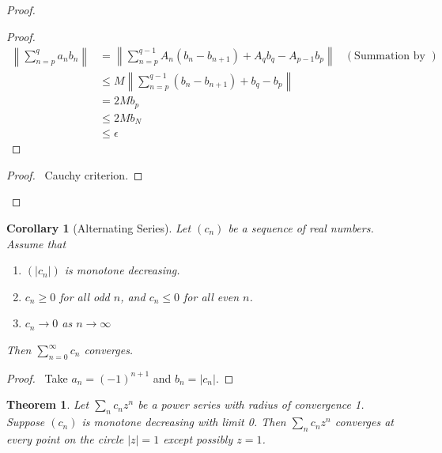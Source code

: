 \documentclass{book}
\let\qed\relax
\newtheorem{cor}{Corollary}[prop]
\newtheorem{thm}[prop]{Theorem}
\theoremstyle{definition}
\begin{document}
\begin{proof}
\pf
{}
\begin{proof}
	\pf
	\begin{align*}
		\left\| \sum_{n=p}^q a_n b_n \right\|
		& = \left\| \sum_{n=p}^{q-1} A_n (b_n - b_{n+1}) + A_q b_q - A_{p-1} b_p \right\| & (\text{Summation by Parts}) \\
		& \leq M \left\| \sum_{n=p}^{q-1} (b_n - b_{n+1}) + b_q - b_p \right\| \\
		& = 2 M b_p \\
		& \leq 2 M b_N \\
		& \leq \epsilon
	\end{align*}
\end{proof}
\qedstep
\begin{proof}
	\pf\ Cauchy criterion.
\end{proof}
\qed
\end{proof}

\begin{cor}[Alternating Series]
Let $(c_n)$ be a sequence of real numbers. Assume that
\begin{enumerate}
\item $(|c_n|)$ is monotone decreasing.
\item $c_n \geq 0$ for all odd $n$, and $c_n \leq 0$ for all even $n$.
\item $c_n \rightarrow 0$ as $n \rightarrow \infty$
\end{enumerate}
Then $\sum_{n=0}^\infty c_n$ converges.
\end{cor}

\begin{proof}
\pf\ Take $a_n = (-1)^{n+1}$ and $b_n = |c_n|$. \qed
\end{proof}

\begin{thm}
Let $\sum_n c_n z^n$ be a power series with radius of convergence 1. Suppose $(c_n)$ is monotone decreasing with limit 0. Then $\sum_n c_n z^n$ converges at every point on the circle $|z| = 1$ except possibly $z = 1$.
\end{thm}
\end{document}
